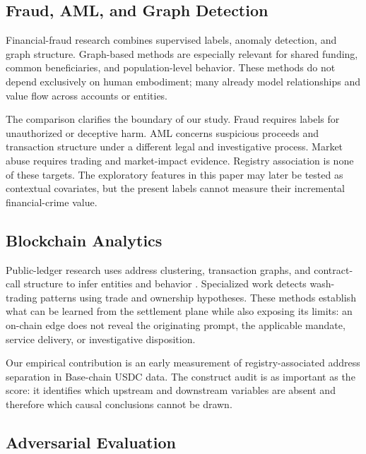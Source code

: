 \subsection{Fraud, AML, and Graph Detection}\label{subsec:rw-fraud}

Financial-fraud research combines supervised labels, anomaly detection, and
graph structure\cite{chandola2009,carcillo2021,hilal2022}.  Graph-based methods
are especially relevant for shared funding, common beneficiaries, and
population-level behavior\cite{pourhabibi2020,wei2021}.  These methods do not
depend exclusively on human embodiment; many already model relationships and
value flow across accounts or entities.

The comparison clarifies the boundary of our study.  Fraud requires labels for
unauthorized or deceptive harm.  AML concerns suspicious proceeds and
transaction structure under a different legal and investigative process.
Market abuse requires trading and market-impact evidence.  Registry association
is none of these targets.  The exploratory features in this paper may later be
tested as contextual covariates, but the present labels cannot measure their
incremental financial-crime value.

\subsection{Blockchain Analytics}\label{subsec:rw-blockchain}

Public-ledger research uses address clustering, transaction graphs, and
contract-call structure to infer entities and behavior
\cite{meiklejohn2016,chen2020}.  Specialized work detects wash-trading patterns
using trade and ownership hypotheses\cite{victor2021}.  These methods establish
what can be learned from the settlement plane while also exposing its limits:
an on-chain edge does not reveal the originating prompt, the applicable mandate,
service delivery, or investigative disposition.

Our empirical contribution is an early measurement of registry-associated
address separation in Base-chain USDC data.  The construct audit is as important
as the score: it identifies which upstream and downstream variables are absent
and therefore which causal conclusions cannot be drawn.

\subsection{Adversarial Evaluation}\label{subsec:rw-advml}

